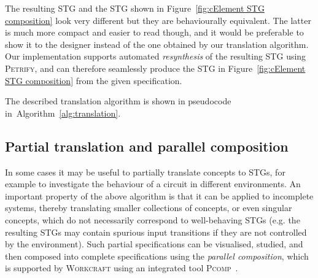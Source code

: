 \documentclass[british, journal]{IEEEtran}
\newcommand{\noun}[1]{\textsc{#1}}
\begin{document}
The resulting STG and the STG shown in Figure~\ref{fig:cElement STG composition}
look very different but they are behaviourally equivalent. The latter is much more
compact and easier to read though, and it would be preferable to show it to the
designer instead of the one obtained by our translation algorithm. Our
implementation supports automated \emph{resynthesis} of the resulting STG
using \noun{Petrify}, and can therefore seamlessly produce the STG in
Figure~\ref{fig:cElement STG composition} from the given specification.




The described translation algorithm is shown in pseudocode
in~Algorithm~\ref{alg:translation}.

\vspace{-1mm}
\subsection{Partial translation and parallel composition}

In some cases it may be useful to partially translate concepts to STGs, for
example to investigate the behaviour of a circuit
in different environments. An important property of the above algorithm is
that it can be applied to incomplete systems, thereby translating
smaller collections of concepts, or even singular concepts, which do not
necessarily correspond to well-behaving STGs (e.g. the resulting STGs may contain
spurious input transitions if they are not controlled by the environment).
Such partial specifications can be visualised, studied, and then composed into
complete specifications using the \emph{parallel composition}, which is supported
by \noun{Workcraft} using an integrated tool \noun{Pcomp}~\cite{PCOMP}.
\end{document}
